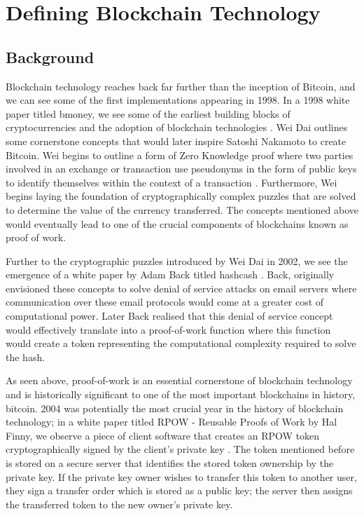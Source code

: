 \section{Defining Blockchain Technology}

\subsection{Background}

Blockchain technology reaches back far further than the inception of Bitcoin, and we can see some of the first implementations appearing in 1998.
In a 1998 white paper titled bmoney, we see some of the earliest building blocks of cryptocurrencies and the adoption of blockchain technologies \autocite{daiBmoney1998}.
Wei Dai outlines some cornerstone concepts that would later inspire Satoshi Nakamoto to create Bitcoin. Wei begins to outline a form of Zero Knowledge proof where two parties involved in an exchange or transaction use pseudonyms in the form of public keys to identify themselves within the context of a transaction \autocite{ZeroknowledgeProofsEthereum2022}. Furthermore, Wei begins laying the foundation of cryptographically complex puzzles that are solved to determine the value of the currency transferred. The concepts mentioned above would eventually lead to one of the crucial components of blockchains known as proof of work.\par
Further to the cryptographic puzzles introduced by Wei Dai in 2002, we see the emergence of a white paper by Adam Back titled hashcash \autocite{backHashcashDenialService2002}. Back, originally envisioned these concepts to solve denial of service attacks on email servers where communication over these email protocols would come at a greater cost of computational power. Later Back realised that this denial of service concept would effectively translate into a proof-of-work function where this function would create a token representing the computational complexity required to solve the hash.\par
As seen above, proof-of-work is an essential cornerstone of blockchain technology and is historically significant to one of the most important blockchains in history, bitcoin. 2004 was potentially the most crucial year in the history of blockchain technology; in a white paper titled RPOW - Reusable Proofs of Work by Hal Finny, we observe a piece of client software that creates an RPOW token cryptographically signed by the client's private key \autocite{finneyRPOWReusableProofs}. The token mentioned before is stored on a secure server that identifies the stored token ownership by the private key. If the private key owner wishes to transfer this token to another user, they sign a transfer order which is stored as a public key; the server then assigns the transferred token to the new owner's private key.\par
